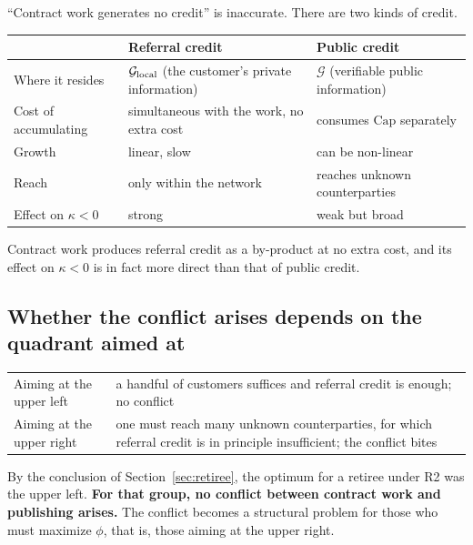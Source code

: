 ``Contract work generates no credit'' is inaccurate. There are two kinds of credit.

\begin{center}
\begin{tabularx}{\textwidth}{@{}lXX@{}}
\toprule
 & Referral credit & Public credit \\
\midrule
Where it resides & $\mathcal{G}_{\rm local}$ (the customer's private information) & $\mathcal{G}$ (verifiable public information) \\
Cost of accumulating & simultaneous with the work, no extra cost & consumes $\mathrm{Cap}$ separately \\
Growth & linear, slow & can be non-linear \\
Reach & only within the network & reaches unknown counterparties \\
Effect on $\kappa<0$ & strong & weak but broad \\
\bottomrule
\end{tabularx}
\label{tab:solo-credit-types}
\end{center}

Contract work produces referral credit as a by-product at no extra cost, and its effect on
$\kappa<0$ is in fact more direct than that of public credit.

\subsection{Whether the conflict arises depends on the quadrant aimed at}

\begin{center}
\begin{tabularx}{\textwidth}{@{}lX@{}}
\toprule
Aiming at the upper left & a handful of customers suffices and referral credit is enough; no conflict \\
Aiming at the upper right & one must reach many unknown counterparties, for which referral credit is in principle insufficient; the conflict bites \\
\bottomrule
\end{tabularx}
\label{tab:solo-quadrant-tradeoff}
\end{center}

By the conclusion of Section~\ref{sec:retiree}, the optimum for a retiree under R2 was the
upper left. \textbf{For that group, no conflict between contract work and publishing arises.}
The conflict becomes a structural problem for those who must maximize $\phi$, that is, those
aiming at the upper right.

